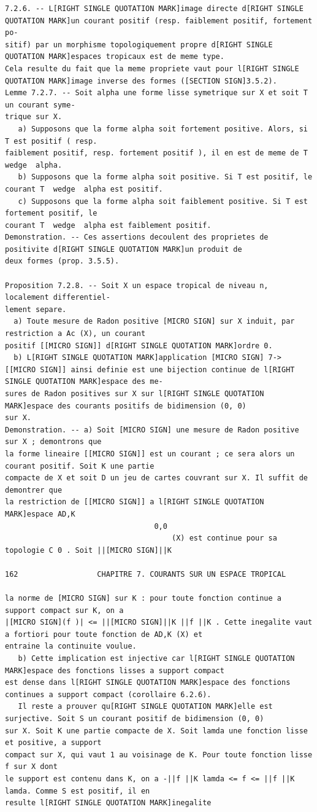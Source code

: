 \documentclass[
  11pt,
]{article}
\begin{document}
\begin{lstlisting}
7.2.6. -- L[RIGHT SINGLE QUOTATION MARK]image directe d[RIGHT SINGLE QUOTATION MARK]un courant positif (resp. faiblement positif, fortement po-
sitif) par un morphisme topologiquement propre d[RIGHT SINGLE QUOTATION MARK]espaces tropicaux est de meme type.
Cela resulte du fait que la meme propriete vaut pour l[RIGHT SINGLE QUOTATION MARK]image inverse des formes ([SECTION SIGN]3.5.2).
Lemme 7.2.7. -- Soit alpha une forme lisse symetrique sur X et soit T un courant syme-
trique sur X.
   a) Supposons que la forme alpha soit fortement positive. Alors, si T est positif ( resp.
faiblement positif, resp. fortement positif ), il en est de meme de T  wedge  alpha.
   b) Supposons que la forme alpha soit positive. Si T est positif, le courant T  wedge  alpha est positif.
   c) Supposons que la forme alpha soit faiblement positive. Si T est fortement positif, le
courant T  wedge  alpha est faiblement positif.
Demonstration. -- Ces assertions decoulent des proprietes de positivite d[RIGHT SINGLE QUOTATION MARK]un produit de
deux formes (prop. 3.5.5).

Proposition 7.2.8. -- Soit X un espace tropical de niveau n, localement differentiel-
lement separe.
  a) Toute mesure de Radon positive [MICRO SIGN] sur X induit, par restriction a Ac (X), un courant
positif [[MICRO SIGN]] d[RIGHT SINGLE QUOTATION MARK]ordre 0.
  b) L[RIGHT SINGLE QUOTATION MARK]application [MICRO SIGN] 7-> [[MICRO SIGN]] ainsi definie est une bijection continue de l[RIGHT SINGLE QUOTATION MARK]espace des me-
sures de Radon positives sur X sur l[RIGHT SINGLE QUOTATION MARK]espace des courants positifs de bidimension (0, 0)
sur X.
Demonstration. -- a) Soit [MICRO SIGN] une mesure de Radon positive sur X ; demontrons que
la forme lineaire [[MICRO SIGN]] est un courant ; ce sera alors un courant positif. Soit K une partie
compacte de X et soit D un jeu de cartes couvrant sur X. Il suffit de demontrer que
la restriction de [[MICRO SIGN]] a l[RIGHT SINGLE QUOTATION MARK]espace AD,K
                                  0,0
                                      (X) est continue pour sa topologie C 0 . Soit ||[MICRO SIGN]||K

162                  CHAPITRE 7. COURANTS SUR UN ESPACE TROPICAL

la norme de [MICRO SIGN] sur K : pour toute fonction continue a support compact sur K, on a
|[MICRO SIGN](f )| <= ||[MICRO SIGN]||K ||f ||K . Cette inegalite vaut a fortiori pour toute fonction de AD,K (X) et
entraine la continuite voulue.
   b) Cette implication est injective car l[RIGHT SINGLE QUOTATION MARK]espace des fonctions lisses a support compact
est dense dans l[RIGHT SINGLE QUOTATION MARK]espace des fonctions continues a support compact (corollaire 6.2.6).
   Il reste a prouver qu[RIGHT SINGLE QUOTATION MARK]elle est surjective. Soit S un courant positif de bidimension (0, 0)
sur X. Soit K une partie compacte de X. Soit lamda une fonction lisse et positive, a support
compact sur X, qui vaut 1 au voisinage de K. Pour toute fonction lisse f sur X dont
le support est contenu dans K, on a -||f ||K lamda <= f <= ||f ||K lamda. Comme S est positif, il en
resulte l[RIGHT SINGLE QUOTATION MARK]inegalite
\end{lstlisting}
\end{document}
